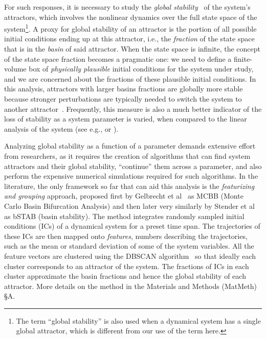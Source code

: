 \documentclass[9pt,twocolumn,twoside,lineno]{pnas-new}
\begin{document}
For such responses, it is necessary to study the \emph{global stability}~\cite{Menck2013} of the system's attractors, which involves the nonlinear dynamics over the full state space of the system\footnote{The term ``global stability'' is also used when a dynamical system has a single global attractor, which is different from our use of the term here.}. A proxy for global stability of an attractor is the portion of all possible initial conditions ending up at this attractor, i.e., the \emph{fraction} of the state space that is in the \emph{basin} of said attractor. When the state space is infinite, the concept of the state space fraction becomes a pragmatic one: we need to define a finite-volume box of \emph{physically plausible} initial conditions for the system under study, and we are concerned about the fractions of these plausible initial conditions. In this analysis, attractors with larger basins fractions are globally more stable because stronger perturbations are typically needed to switch the system to another attractor~\cite{Menck2013}. Frequently, this measure is also a much better indicator of the loss of stability as a system parameter is varied, when compared to the linear analysis of the system (see e.g., \cite{Menck2013} or \cite[Chap. 12]{DatserisBook}).

Analyzing global stability as a function of a parameter demands extensive effort from researchers, as it requires the creation of algorithms that can find system attractors and their global stability, ``continue'' them across a parameter, and also perform the expensive numerical simulations required for such algorithms. In the literature, the only framework so far that can aid this analysis is the \emph{featurizing and grouping} approach, proposed first by Gelbrecht et al~\cite{Gelbrecht2020} as MCBB (Monte Carlo Basin Bifurcation Analysis) and then later very similarly by Stender et al~\cite{Stender2021} as bSTAB (basin stability). The method integrates randomly sampled initial conditions (ICs) of a dynamical system for a preset time span. The trajectories of these ICs are then mapped onto \emph{features}, numbers describing the trajectories, such as the mean or standard deviation of some of the system variables. All the feature vectors are clustered using the DBSCAN algorithm~\cite{Ester1996} so that ideally each cluster corresponds to an attractor of the system. The fractions of ICs in each cluster approximate the basin fractions and hence the global stability of each attractor. More details on the method in the Materials and Methods (MatMeth) \S A.
\end{document}
